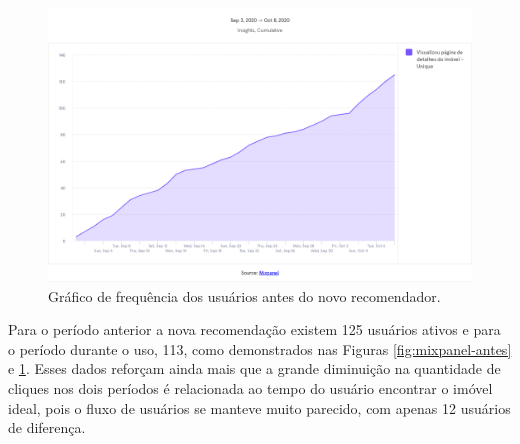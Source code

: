 \begin{figure}[H]
    \centering
    \includegraphics[scale=0.38]{figuras/desenvolvimento/mixpanel-depois.png}
    \caption[Gráfico de frequência dos usuários antes do novo recomendador]{Gráfico de frequência dos usuários antes do novo recomendador.}
    \label{fig:mixpanel-depois}
\end{figure}

Para o período anterior a nova recomendação existem 125 usuários ativos e para o período durante o uso, 113, como demonstrados nas Figuras \ref{fig:mixpanel-antes} e \ref{fig:mixpanel-depois}. Esses dados reforçam ainda mais que a grande diminuição na quantidade de cliques nos dois períodos é relacionada ao tempo do usuário encontrar o imóvel ideal, pois o fluxo de usuários se manteve muito parecido, com apenas 12 usuários de diferença.














